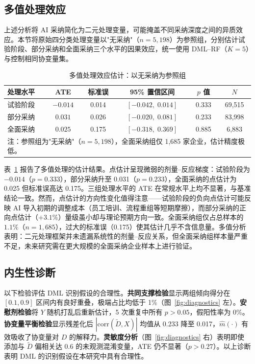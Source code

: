 \documentclass[UTF8,11pt,a4paper]{ctexart}
\begin{document}
\subsection{多值处理效应}

上述分析将 AI 采纳简化为二元处理变量，可能掩盖不同采纳深度之间的异质效应。本节将原始四分类处理变量以"无采纳"（$n = 5{,}198$）为参照组，分别估计试验阶段、部分采纳和全面采纳三个水平的因果效应，统一使用 DML--RF（$K = 5$）与控制相同协变量集。

\begin{table}[H]
\centering
\caption{多值处理效应估计：以无采纳为参照组}
\label{tab:multivalue}
\small
\setlength{\tabcolsep}{4pt}
\begin{tabular}{lccccc}
\toprule
处理水平 & ATE & 标准误 & 95\% 置信区间 & $p$ 值 & $N$ \\
\midrule
试验阶段 & $-0.014$ & 0.014 & $[-0.042,\;0.014]$ & 0.333 & 69{,}515 \\
部分采纳 & $0.031$ & 0.026 & $[-0.020,\;0.081]$ & 0.233 & 83{,}998 \\
全面采纳 & $0.025$ & 0.175 & $[-0.318,\;0.369]$ & 0.885 & 6{,}883 \\
\bottomrule
\multicolumn{6}{l}{\footnotesize 注：参照组为"无采纳"（$n = 5{,}198$），全面采纳组仅 1{,}685 家企业，估计精度极低。}
\end{tabular}
\end{table}

表~\ref{tab:multivalue} 报告了多值处理的估计结果。点估计呈现微弱的剂量--反应梯度：试验阶段为 $-0.014$（$p = 0.333$），部分采纳升至 0.031（$p = 0.233$），全面采纳的点估计为 0.025 但标准误高达 0.175。三组处理水平的 ATE 在常规水平上均不显著，与基准结论一致。然而，点估计的方向性变化值得注意——试验阶段的负向点估计可能反映 AI 导入初期的调整成本（员工培训、流程重组等短期摩擦），而部分采纳的正向点估计（$+3.1\%$）量级虽小却与理论预期方向一致。全面采纳组仅占总样本的 $1.1\%$（$n = 1{,}685$），过大的标准误（0.175）使其估计几乎不含信息量。多值分析表明：二元处理框架并未遗漏系统性的剂量--反应关系，但全面采纳组样本量严重不足，未来研究需在更大规模的全面采纳企业样本上进行验证。

\subsection{内生性诊断}\label{sec:diagnostics}

以下检验评估 DML 识别假设的合理性。\textbf{共同支撑检验}显示两组倾向得分在 $[0.1, 0.9]$ 区间内有良好重叠，极端占比均低于 1\%（图~\ref{fig:diagnostics} 左）。\textbf{安慰剂检验}将 $Y$ 随机打乱后重新估计，5 次重复中所有 $p > 0.05$，假阳性率为 0\%。\textbf{协变量平衡检验}显示残差化后 $|\text{corr}(\tilde D, X)|$ 均值从 0.233 降至 0.017，$\hat m(\cdot)$ 有效吸收了协变量对 $D$ 的解释力。\textbf{灵敏度分析}（图~\ref{fig:diagnostics} 右）表明即使添加与 $\tilde D$ 偏相关达 0.6 的未观测混淆变量，ATE 仍不显著（$p > 0.27$）。以上诊断表明 DML 的识别假设在本研究中具有合理性。
\end{document}
